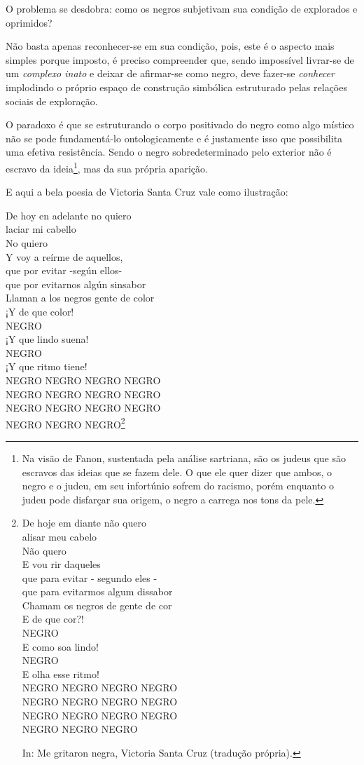 O problema se desdobra: como os negros subjetivam sua condição de
explorados e oprimidos?

Não basta apenas reconhecer-se em sua condição, pois, este é o aspecto
mais simples porque imposto, é preciso compreender que, sendo impossível
livrar-se de um \emph{complexo inato} e deixar de afirmar-se como negro,
deve fazer-se \emph{conhecer} implodindo o próprio espaço de construção
simbólica estruturado pelas relações sociais de exploração.

O paradoxo é que se estruturando o corpo positivado do negro como algo
místico não se pode fundamentá-lo ontologicamente e é justamente isso
que possibilita uma efetiva resistência. Sendo o negro sobredeterminado
pelo exterior não é escravo da ideia\footnote{Na visão de Fanon,
  sustentada pela análise sartriana, são os judeus que são escravos das
  ideias que se fazem dele. O que ele quer dizer que ambos, o negro e o
  judeu, em seu infortúnio sofrem do racismo, porém enquanto o judeu
  pode disfarçar sua origem, o negro a carrega nos tons da pele.}, mas
da sua própria aparição.

E aqui a bela poesia de Victoria Santa Cruz vale como ilustração:

De hoy en adelante no quiero\\
laciar mi cabello\\
No quiero\\
Y voy a reírme de aquellos,\\
que por evitar -según ellos-\\
que por evitarnos algún sinsabor\\
Llaman a los negros gente de color\\
¡Y de que color!\\
NEGRO\\
¡Y que lindo suena!\\
NEGRO\\
¡Y que ritmo tiene!\\
NEGRO NEGRO NEGRO NEGRO\\
NEGRO NEGRO NEGRO NEGRO\\
NEGRO NEGRO NEGRO NEGRO\\
NEGRO NEGRO NEGRO\footnote{De hoje em diante não quero\\
  alisar meu cabelo\\
  Não quero\\
  E vou rir daqueles\\
  que para evitar - segundo eles -\\
  que para evitarmos algum dissabor\\
  Chamam os negros de gente de cor\\
  E de que cor?!\\
  NEGRO\\
  E como soa lindo!\\
  NEGRO\\
  E olha esse ritmo!\\
  NEGRO NEGRO NEGRO NEGRO\\
  NEGRO NEGRO NEGRO NEGRO\\
  NEGRO NEGRO NEGRO NEGRO\\
  NEGRO NEGRO NEGRO

  In: Me gritaron negra, Victoria Santa Cruz (tradução própria).}

